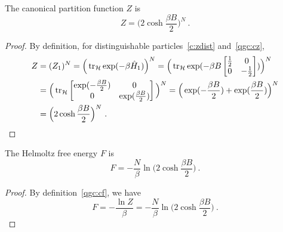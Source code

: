     The canonical partition function $Z$ is 
    \begin{equation*}
        Z = \Big ( 2 \cosh \frac{\beta B}{2} \Big)^N ~.
    \end{equation*}
    \begin{proof}
        By definition, for distinguishable particles~\eqref{c:zdist} and~\eqref{qgc:cz},
        \begin{equation*}
        \begin{aligned}
            Z & = (Z_1)^N = \Big (\operatorname{tr}_{\mathcal H} \exp(- \beta \hat H_1) \Big)^N = \Big (\operatorname{tr}_{\mathcal H} \exp(- \beta B \begin{bmatrix}
                \frac{1}{2} & 0 \\ 0 & - \frac{1}{2} \\ 
            \end{bmatrix}) \Big)^N \\ & = \Big(\operatorname{tr}_{\mathcal H} \begin{bmatrix}
                \exp(- \frac{\beta B}{2}) & 0 \\ 0 & \exp(\frac{\beta B}{2}) \\ 
            \end{bmatrix} \Big )^N = \Big( \exp(- \frac{\beta B}{2}) + \exp(\frac{\beta B}{2}) \Big)^N \\ & = \Big ( 2 \cosh \frac{\beta B}{2} \Big)^N ~.
        \end{aligned}
        \end{equation*}
    \end{proof}

    The Helmoltz free energy $F$ is 
    \begin{equation*}
        F = - \frac{N}{\beta} \ln \Big ( 2 \cosh \frac{\beta B}{2} \Big) ~.
    \end{equation*}
    \begin{proof}
        By definition~\eqref{qgc:cf}, we have
        \begin{equation*}
            F = - \frac{\ln Z}{\beta} = - \frac{N}{\beta} \ln \Big ( 2 \cosh \frac{\beta B}{2} \Big) ~.
        \end{equation*}
    \end{proof}

